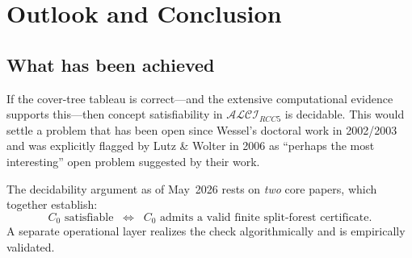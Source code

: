 \documentclass[
]{ceurart}
\theoremstyle{definition}
\newcommand{\ALCIRCC}[1]{\ensuremath{\mathcal{ALCI}_{\mathit{RCC#1}}}}
\begin{document}
\section{Outlook and Conclusion}
\label{sec:outlook}

\subsection{What has been achieved}

If the cover-tree tableau is correct---and the extensive
computational evidence supports this---then concept satisfiability
in $\ALCIRCC{5}$ is decidable.  This would settle a problem that
has been open since Wessel's doctoral work in 2002/2003 and was
explicitly flagged by Lutz \& Wolter in 2006 as ``perhaps the
most interesting'' open problem suggested by their work.

The decidability argument as of May~2026 rests on \emph{two}
core papers, which together establish:
\[
  \text{$C_0$ satisfiable}
  \;\;\Longleftrightarrow\;\;
  \text{$C_0$ admits a valid finite split-forest certificate.}
\]
A separate operational layer realizes the check algorithmically and
is empirically validated.
\end{document}
